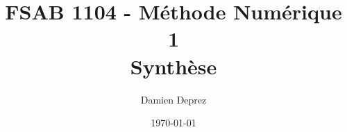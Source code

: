 \documentclass[12pt,a4paper,twoside]{report}
\begin{document}
\makeatletter

\author{Damien Deprez}
\title{FSAB 1104 - Méthode Numérique 1\\Synthèse}
\date{\today}
\titre{\@title}{\@author}{\@date}{}{}

\tableofcontents
\end{document}
